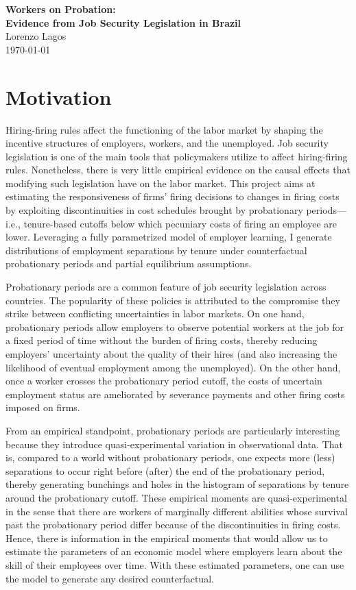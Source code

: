 \documentclass[12pt]{article}
\begin{document}
\begin{center}
  \Large \textbf{Workers on Probation:\\Evidence from Job Security Legislation in Brazil} \\
  \vspace{0.1in}
  \normalsize Lorenzo Lagos \\
  \today
\end{center}

\section{Motivation}

Hiring-firing rules affect the functioning of the labor market by shaping the incentive structures of employers, workers, and the unemployed.
Job security legislation is one of the main tools that policymakers utilize to affect hiring-firing rules. 
Nonetheless, there is very little empirical evidence on the causal effects that modifying such legislation have on the labor market.
This project aims at estimating the responsiveness of firms' firing decisions to changes in firing costs by exploiting discontinuities in cost schedules brought by probationary periods---i.e., tenure-based cutoffs below which pecuniary costs of firing an employee are lower.
Leveraging a fully parametrized model of employer learning, I generate distributions of employment separations by tenure under counterfactual probationary periods and partial equilibrium assumptions. 

Probationary periods are a common feature of job security legislation across countries.
The popularity of these policies is attributed to the compromise they strike between conflicting uncertainties in labor markets.
On one hand, probationary periods allow employers to observe potential workers at the job for a fixed period of time without the burden of firing costs, thereby reducing employers' uncertainty about the quality of their hires (and also increasing the likelihood of eventual employment among the unemployed).
On the other hand, once a worker crosses the probationary period cutoff, the costs of uncertain employment status are ameliorated by severance payments and other firing costs imposed on firms.

From an empirical standpoint, probationary periods are particularly interesting because they introduce quasi-experimental variation in observational data.
That is, compared to a world without probationary periods, one expects more (less) separations to occur right before (after) the end of the probationary period, thereby generating bunchings and holes in the histogram of separations by tenure around the probationary cutoff. 
These empirical moments are quasi-experimental in the sense that there are workers of marginally different abilities whose survival past the probationary period differ because of the discontinuities in firing costs. 
Hence, there is information in the empirical moments that would allow us to estimate the parameters of an economic model where employers learn about the skill of their employees over time. 
With these estimated parameters, one can use the model to generate any desired counterfactual.
\end{document}
